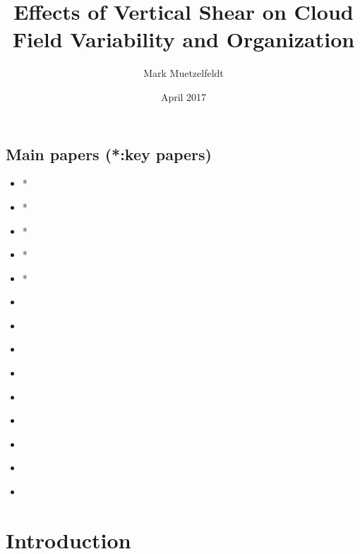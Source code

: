 \documentclass[11pt,a4paper]{article}
\title{Effects of Vertical Shear on Cloud Field Variability and Organization }
\author{Mark Muetzelfeldt}
\date{April 2017}
\begin{document}
\maketitle

\subsection*{Main papers (*:key papers)}
\begin{itemize}
    \item * \cite{CC2006I}
    \item * \cite{CC2006II}
    \item * \cite{RE2001}
    \item * \cite{RKW1988}
    \item * \cite{PC2008}
    \item \cite{birch2014scale}
    \item \cite{cohen2004response}
    \item \cite{gregory1997parametrization}
    \item \cite{houze1977structure}
    \item \cite{kershaw1997parametrization}
    \item \cite{robe1996moist}
    \item \cite{sakradzija2016stochastic}
    \item \cite{sengupta1990cumulus}
    \item \cite{TMM1982}
\end{itemize}

\section{Introduction}

\end{document}
